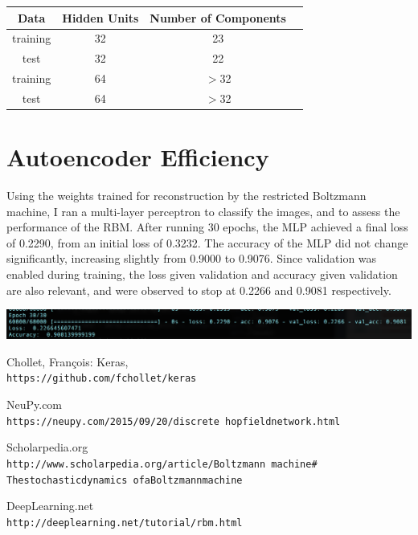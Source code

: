 \documentclass[11pt]{amsart}
\theoremstyle{remark}
\theoremstyle{remark}
\numberwithin{equation}{section}
\begin{document}
\begin{center}
  \small
  \tabcolsep=0.11cm 
 \begin{tabular}{ |c|c|c|c| } 
       \hline
		Data & Hidden Units & Number of Components \\
		\hline
		training & 32 & 23 \\
		test & 32 & 22 \\
		training & 64 & $>$32 \\
		test & 64 & $>$32 \\
       \hline
 \end{tabular}
 \end{center}


\section{Autoencoder Efficiency}

Using the weights trained for reconstruction by the restricted Boltzmann machine, I ran a 
multi-layer perceptron to classify the images, and to assess the performance of the RBM. 
After running 30 epochs, the MLP achieved a final loss of 0.2290, from an initial loss of 
0.3232. The accuracy of the MLP did not change significantly, increasing slightly from 
0.9000 to 0.9076. Since validation was enabled during training, the loss given 
validation and accuracy given validation are also relevant, and were observed to 
stop at 0.2266 and 0.9081 respectively. 

\graphicspath{ {../Images/restrictedBM/} }
\begin{center}
 \includegraphics[width=1.25\textwidth]{scores.png}\hfill
\end{center}

\begin{thebibliography}{99}

Chollet, Fran\c{c}ois: Keras,
\\\texttt{https://github.com/fchollet/keras} 

NeuPy.com
\\\texttt{https://neupy.com/2015/09/20/discrete\textunderscore 
hopfield\textunderscore network.html}

Scholarpedia.org
\\\texttt{http://www.scholarpedia.org/article/Boltzmann\textunderscore 
machine\# The\textunderscore stochastic\textunderscore dynamics
\textunderscore of\textunderscore a\textunderscore Boltzmann\textunderscore machine}

DeepLearning.net
\\\texttt{http://deeplearning.net/tutorial/rbm.html}

\end{thebibliography}
\end{document}
